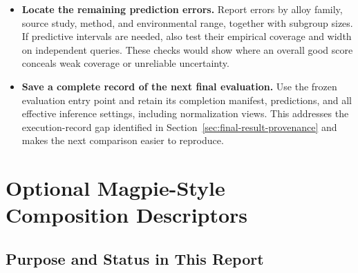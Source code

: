 \documentclass[11pt]{article}
\newenvironment{notes}
  {\begin{itemize}\setlength{\itemsep}{0.45em}\setlength{\parsep}{0pt}}
  {\end{itemize}}
\begin{document}
\begin{notes}
    \item \textbf{Locate the remaining prediction errors.}
    Report errors by alloy family, source study, method,
    and environmental range, together with subgroup sizes.
    If predictive intervals are needed, also test their
    empirical coverage and width on independent queries.
    These checks would show where an overall good score
    conceals weak coverage or unreliable uncertainty.

    \item \textbf{Save a complete record of the next final evaluation.}
    Use the frozen evaluation entry point and retain its
    completion manifest, predictions, and all effective
    inference settings, including normalization views.
    This addresses the execution-record gap identified in
    Section~\ref{sec:final-result-provenance} and makes the
    next comparison easier to reproduce.
\end{notes}

\section{Optional Magpie-Style Composition Descriptors}
\label{sec:magpie-descriptors}

\subsection{Purpose and Status in This Report}
\label{sec:magpie-purpose}
\end{document}
